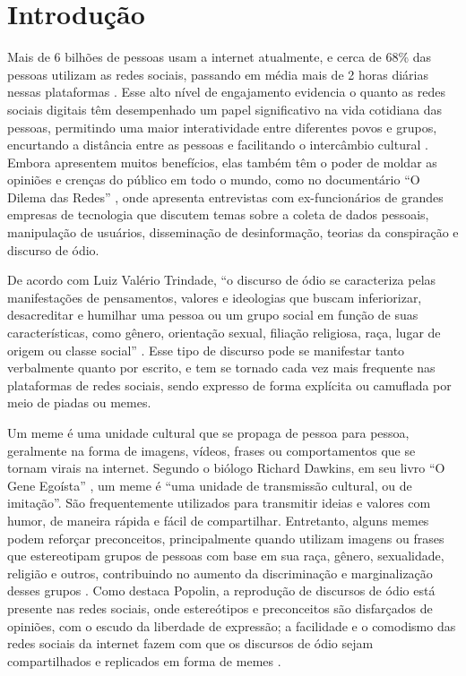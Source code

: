 \chapter{Introdução}
\label{cap:01}

Mais de 6 bilhões de pessoas usam a internet atualmente, e cerca de 68\% das pessoas utilizam as redes sociais, passando em média mais de 2 horas diárias nessas plataformas \cite{DataReportal2026}. Esse alto nível de engajamento evidencia o quanto as redes sociais digitais têm desempenhado um papel significativo na vida cotidiana das pessoas, permitindo uma maior interatividade entre diferentes povos e grupos, encurtando a distância entre as pessoas e facilitando o intercâmbio cultural \cite{Nascimento2017}. Embora apresentem muitos benefícios, elas também têm o poder de moldar as opiniões e crenças do público em todo o mundo, como no documentário “O Dilema das Redes” \cite{SocialDilemma2020}, onde apresenta entrevistas com ex-funcionários de grandes empresas de tecnologia que discutem temas sobre a coleta de dados pessoais, manipulação de usuários, disseminação de desinformação, teorias da conspiração e discurso de ódio.

De acordo com Luiz Valério Trindade, ``o discurso de ódio se caracteriza pelas manifestações de pensamentos, valores e ideologias que buscam inferiorizar, desacreditar e humilhar uma pessoa ou um grupo social em função de suas características, como gênero, orientação sexual, filiação religiosa, raça, lugar de origem ou classe social'' \cite{Trindade2022}. Esse tipo de discurso pode se manifestar tanto verbalmente quanto por escrito, e tem se tornado cada vez mais frequente nas plataformas de redes sociais, sendo expresso de forma explícita ou camuflada por meio de piadas ou memes.

Um meme é uma unidade cultural que se propaga de pessoa para pessoa, geralmente na forma de imagens, vídeos, frases ou comportamentos que se tornam virais na internet. Segundo o biólogo Richard Dawkins, em seu livro “O Gene Egoísta” \cite{Dawkins1976}, um meme é ``uma unidade de transmissão cultural, ou de imitação''. São frequentemente utilizados para transmitir ideias e valores com humor, de maneira rápida e fácil de compartilhar. Entretanto, alguns memes podem reforçar preconceitos, principalmente quando utilizam imagens ou frases que estereotipam grupos de pessoas com base em sua raça, gênero, sexualidade, religião e outros, contribuindo no aumento da discriminação e marginalização desses grupos \cite{phillips2015}. Como destaca Popolin, a reprodução de discursos de ódio está presente nas redes sociais, onde estereótipos e preconceitos são disfarçados de opiniões, com o escudo da liberdade de expressão; a facilidade e o comodismo das redes sociais da internet fazem com que os discursos de ódio sejam compartilhados e replicados em forma de memes \cite{POPOLIN2018}.

